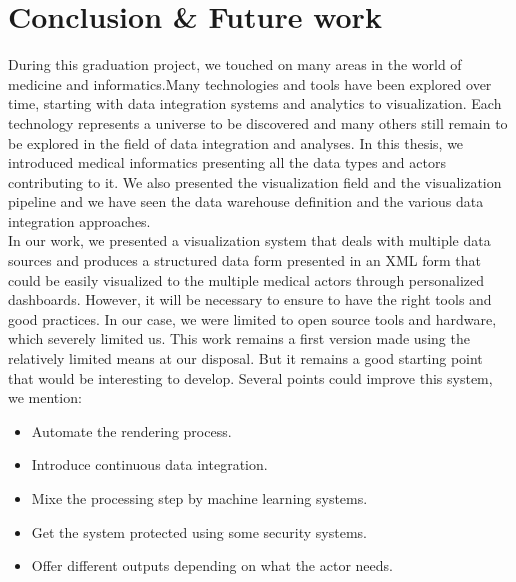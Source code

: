 \chapter{Conclusion \& Future work}
During this graduation project, we touched on many areas in the world of medicine and informatics.Many technologies and tools have been explored over time, starting with data integration systems and analytics to visualization. Each technology represents a universe to be discovered and many others still remain to be explored in the field of data integration and analyses.
\bigbreak
In this thesis, we introduced medical informatics presenting all the data types and actors contributing to it. We also presented the visualization field and the visualization pipeline and we have seen the data warehouse definition and the various data integration approaches.\\
In our work, we presented a visualization system that deals with multiple data sources and produces a structured data form presented in an XML form that could be easily visualized to the multiple medical actors through personalized dashboards. However, it will be necessary to ensure to have the right tools and good practices. In our case, we were limited to open source tools and hardware, which severely limited us.
\bigbreak
This work remains a first version made using the relatively limited means at our disposal. But it remains a good starting point that would be interesting to develop. Several points could improve this system, we mention:
\begin{itemize}
\renewcommand{\labelitemi}{$\bullet$}
\item Automate the rendering process.
\item Introduce continuous data integration.
\item Mixe the processing step by machine learning systems.
\item Get the system protected using some security systems.
\item Offer different outputs depending on what the actor needs.
\end{itemize}
